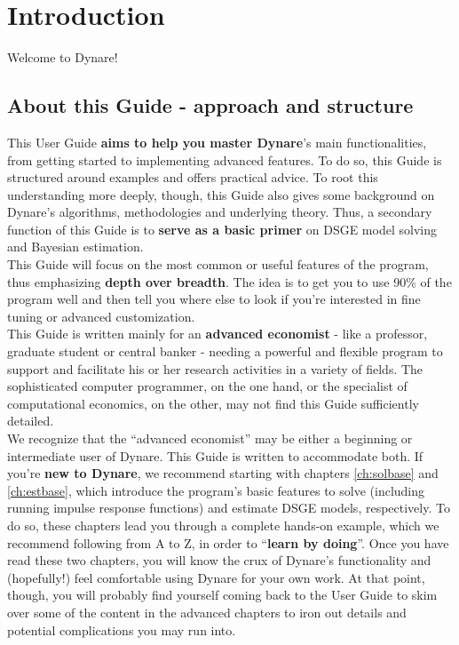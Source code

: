 \chapter{Introduction} \label{ch:intro}

Welcome to Dynare! \\

\section{About this Guide - approach and structure}
This User Guide \textbf{aims to help you master Dynare}'s main functionalities, from getting started to implementing advanced features. To do so, this Guide is structured around examples and offers practical advice. To root this understanding more deeply, though, this Guide also gives some background on Dynare's algorithms, methodologies and underlying theory. Thus, a secondary function of this Guide is to \textbf{serve as a basic primer} on DSGE model solving and Bayesian estimation. \\

This Guide will focus on the most common or useful features of the program, thus emphasizing \textbf{depth over breadth}. The idea is to get you to use 90\% of the program well and then tell you where else to look if you're interested in fine tuning or advanced customization.\\

This Guide is written mainly for an \textbf{advanced economist} - like a professor, graduate student or central banker - needing a powerful and flexible program to support and facilitate his or her research activities in a variety of fields. The sophisticated computer programmer, on the one hand, or the specialist of computational economics, on the other, may not find this Guide sufficiently detailed. \\

We recognize that the ``advanced economist'' may be either a beginning or intermediate user of Dynare. This Guide is written to accommodate both. If you're \textbf{new to Dynare}, we recommend starting with chapters \ref{ch:solbase} and \ref{ch:estbase}, which introduce the program's basic features to solve (including running impulse response functions) and estimate DSGE models, respectively. To do so, these chapters lead you through a complete hands-on example, which we recommend following from A to Z, in order to ``\textbf{learn by doing}''. Once you have read these two chapters, you will know the crux of Dynare's functionality and (hopefully!) feel comfortable using Dynare for your own work. At that point, though, you will probably find yourself coming back to the User Guide to skim over some of the content in the advanced chapters to iron out details and potential complications you may run into.\\

